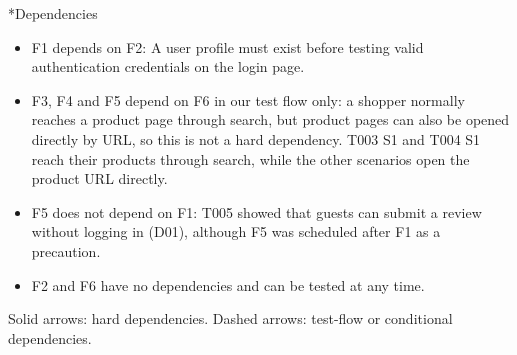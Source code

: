 \documentclass[11pt,a4paper]{article}
\makeatletter
\renewcommand\subsection{\@startsection{subsection}{2}{0pt}{2ex plus .5ex}{.8ex}{\Large\bfseries}}
\makeatother
\begin{document}
\vspace{-1ex}

\subsection*{Dependencies}
\begin{itemize}
  \item F1 depends on F2: A user profile must exist before testing valid authentication credentials on the login page.
  \item F3, F4 and F5 depend on F6 in our test flow only: a shopper normally reaches a product page through search, but product pages can also be opened directly by URL, so this is not a hard dependency. T003 S1 and T004 S1 reach their products through search, while the other scenarios open the product URL directly.
  \item F5 does not depend on F1: T005 showed that guests can submit a review without logging in (D01), although F5 was scheduled after F1 as a precaution.
  \item F2 and F6 have no dependencies and can be tested at any time.
\end{itemize}

\begin{center}

{\small Solid arrows: hard dependencies. Dashed arrows: test-flow or conditional dependencies.}
\end{center}
\clearpage
\end{document}
